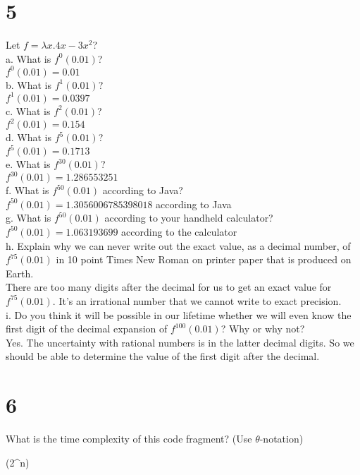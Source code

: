 \documentclass{article}
\begin{document}
\section*{5}
    \item Let $f = \lambda x. 4x - 3x^{2}$?
    \\a. What is $f^{0}(0.01)$?
    \\$f^{0}(0.01) = 0.01$
    \\b. What is $f^{1}(0.01)$?
    \\$f^{1}(0.01) = 0.0397$
    \\c. What is $f^{2}(0.01)$?
    \\ $f^{2}(0.01) = 0.154$
    \\d. What is $f^{5}(0.01)$?
    \\$f^{5}(0.01) = 0.1713$
    \\e. What is $f^{30}(0.01)$?
    \\$f^{30}(0.01) = 1.286553251$
    \\f. What is $f^{50}(0.01)$ according to Java?
    \\ $f^{50}(0.01) = 1.3056006785398018$ according to Java
    \\g. What is $f^{50}(0.01)$ according to your handheld calculator?
    \\ $f^{50}(0.01) = 1.063193699$ according to the calculator
    \\h. Explain why we can never write out the exact value, as a decimal number, of $f^{75}(0.01)$ in 10 point Times New Roman on printer paper that is produced on Earth.
    \\There are too many digits after the decimal for us to get an exact value for $f^{75}(0.01)$. It's an irrational number that we cannot write to exact precision.
    \\i. Do you think it will be possible in our lifetime whether we will even know the first digit of the decimal expansion of $f^{100}(0.01)$? Why or why not?     
    \\ Yes. The uncertainty with rational numbers is in the latter decimal digits. So we should be able to determine the value of the first digit after the decimal.

\section*{6}
    \item What is the time complexity of this code fragment? (Use $\theta$-notation) 
        \begin{shaded} 
        \theta(2^n)
        \end{shaded}     
\end{document}
